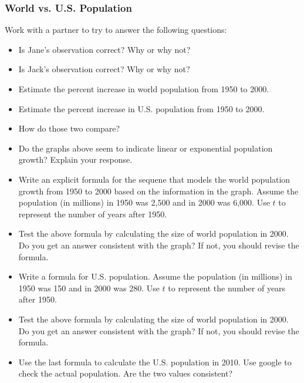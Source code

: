 \documentclass[notheorems
          ]
          {beamer}
\begin{document}
\begin{frame}
 \frametitle {  World vs. U.S. Population  } 
 
 Work with a partner to try to answer the following questions: 
 \scriptsize{ 
 \begin{itemize} [<*>]
  \item Is Jane's observation correct? Why or why not?
  \item Is Jack's observation correct? Why or why not? 
  \item Estimate the percent increase in world population from 1950 to 2000.
  \item Estimate the percent increase in U.S. population from 1950 to 2000.
  \item How do those two compare? 
  \item Do the graphs above seem to indicate linear or exponential population growth? Explain your response. 
  \item Write an explicit formula for the sequene that models the world population growth from 1950 to 2000 based
  on the information in the graph. Assume the population (in millions) in 1950 was 2,500 and in 2000 was 6,000. Use $t$ to
  represent the number of years after 1950. 
  \item Test the above formula by calculating the size of world population in 2000. Do you get an answer consistent with the graph?
  If not, you should revise the formula. 
  \item Write a formula for U.S. population. Assume the population (in millions) in 1950 was 150 and in 2000 was 280. Use $t$ to
  represent the number of years after 1950. 
  \item Test the above formula by calculating the size of world population in 2000. Do you get an answer consistent with the graph?
  If not, you should revise the formula. 
  \item Use the last formula to calculate the U.S. population in 2010. Use google to check the actual population. Are the two values
  consistent? 
  
 \end{itemize}
}

\end{frame}
\end{document}
